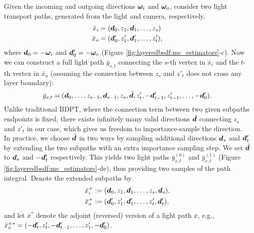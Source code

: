 Given the incoming and outgoing directions $\bm{\omega}_i$ and $\bm{\omega}_o$, consider two light transport paths, generated from the light and camera, respectively.
\begin{equation}
\begin{aligned}
\bar{x}_i &= (\bm{d}_0, z_1, \bm{d}_1, \ldots, z_s) \\
\bar{x}_o &= (\bm{d}'_0, z'_1, \bm{d}'_1, \ldots, z_t'),
\end{aligned}
\end{equation}
where $\bm{d}_0 = -\bm{\omega}_i$ and $\bm{d}'_0 = -\bm{\omega}_o$ (Figure \ref{fig:layeredbsdf:mc_estimators}-c).
Now we can construct a full light path $\bar{y}_{s, t}$ connecting the $s$-th vertex in $\bar{x}_i$ and the $t$-th vertex in $\bar{x}_o$ (assuming the connection between $z_s$ and $z'_t$ does not cross any layer boundary):
\begin{equation}
\bar{y}_{s, t} = (\bm{d}_0, \ldots, z_{s - 1}, \bm{d}_{s - 1}, z_s, \tilde{\bm{d}}, z'_t, -\bm{d}'_{t - 1}, z'_{t - 1}, \ldots, -\bm{d}'_0).
\end{equation}
Unlike traditional BDPT, where the connection term between two given subpaths endpoints is fixed, there exists infinitely many valid directions $\tilde{\bm{d}}$ connecting $z_s$ and $z'_t$ in our case, which gives us freedom to importance-sample the direction. In practice, we choose $\tilde{\bm{d}}$ in two ways by sampling additional directions $\bm{d}_s$ and $\bm{d}'_t$ by extending the two subpaths with an extra importance sampling step. We set $\tilde{\bm{d}}$ to $\bm{d}_s$ and $-\bm{d}'_t$ respectively. This yields two light paths $\bar{y}^{(0)}_{s, t}$ and $\bar{y}^{(1)}_{s, t}$ (Figure \ref{fig:layeredbsdf:mc_estimators}-de), thus providing two samples of the path integral.
Denote the extended subpaths by
\begin{align}
\bar{x}_i^+ &:= (\bm{d}_0, z_1, \bm{d}_1, \ldots, z_s, \bm{d}_s),\\
\bar{x}_o^+ &:= (\bm{d}'_0, z'_1, \bm{d}'_1, \ldots, z'_t, \bm{d}'_t),
\end{align}
and let $\bar{x}^*$ denote the adjoint (reversed) version of a light path $\bar{x}$, e.g., \\$\bar{x}_o^{+*} = (-\bm{d}'_t, z'_t, -\bm{d}'_{t - 1}, \ldots, z'_1, -\bm{d}'_0)$.

